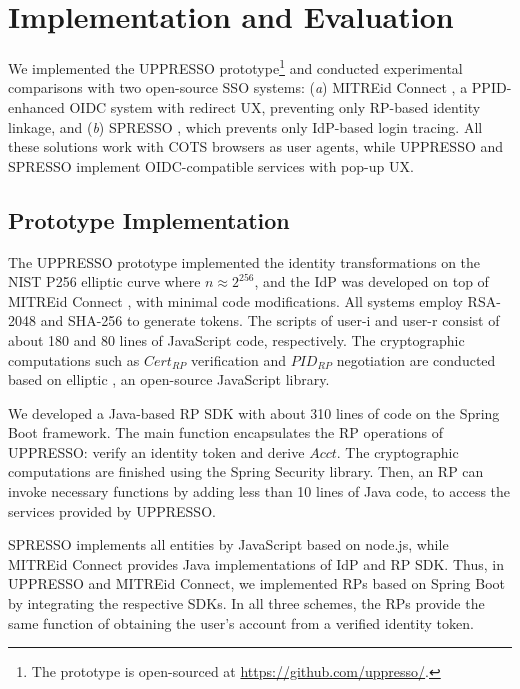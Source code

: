 \section{Implementation and Evaluation}
\label{sec:implementation}

We implemented the UPPRESSO prototype\footnote{The prototype is open-sourced at \url{https://github.com/uppresso/}.} and conducted experimental comparisons with two open-source SSO systems:
 (\emph{a}) MITREid Connect \cite{MITREid}, a PPID-enhanced OIDC system with redirect UX,
  preventing only RP-based identity linkage,
 and (\emph{b}) SPRESSO \cite{SPRESSO}, which prevents only IdP-based login tracing.
All these solutions work with COTS browsers as user agents,
    while UPPRESSO and SPRESSO implement OIDC-compatible services with pop-up UX.

\subsection{Prototype Implementation}
\label{subsec:proto-imple}

The UPPRESSO prototype implemented the identity transformations on the NIST P256 elliptic curve where $n \approx 2^{256}$,
and the IdP was developed on top of MITREid Connect \cite{MITREid}, %
with minimal code modifications.
All systems employ RSA-2048 and SHA-256 to generate tokens.
The scripts of user-i and user-r consist of about 180 and 80 lines of JavaScript code, respectively.  %
The cryptographic computations such as $Cert_{RP}$ verification and $PID_{RP}$ negotiation are conducted based on elliptic \cite{elliptic}, an open-source JavaScript library.

We developed a Java-based RP SDK with about 310 lines of code on the Spring Boot framework.
The main function encapsulates the RP operations of UPPRESSO: verify an identity token and derive $Acct$. The cryptographic computations are finished using the Spring Security library.
Then, an RP can invoke necessary functions by adding less than 10 lines of Java code, to access the services provided by UPPRESSO.

SPRESSO implements all entities by JavaScript based on node.js, while MITREid Connect provides Java implementations of IdP and RP SDK.
Thus, in UPPRESSO and MITREid Connect, we implemented RPs based on Spring Boot by integrating the respective SDKs. In all three schemes, the RPs provide the same function of obtaining the user's account from a verified identity token.


